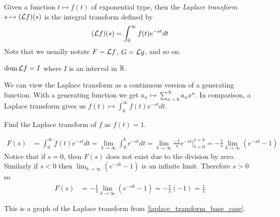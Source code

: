 \documentclass[notes]{subfiles}
\begin{document}
\begin{definition}
    Given a function $t \mapsto f(t)$ of exponential type, then the \textsl{Laplace transform} $s \mapsto (\mathcal{L} f)(s)$ is the integral transform defined by
    \[
        (\mathcal{L} f)(s) = \int_0^\infty f(t)e^{-st}dt
    \]
    Note that we usually notate $F = \mathcal{L} f$, $G = \mathcal{L} g$, and so on.
\end{definition}

\begin{theorem}
    $\operatorname{dom} \mathcal{L} f = I$ where $I$ is an interval in $\mathbb{R}$.
\end{theorem}

We can view the Laplace transform as a continuous version of a generating function. With a generating function we get $a_n \mapsto \sum_{n = 0}^\infty a_n x^n$. In comparison, a Laplace transform gives us $f(t) \mapsto \int_0^\infty f(t)e^{-st}dt$.

\begin{exercise} \label{laplace_transform_base_case}
    Find the Laplace transform of $f$ as $f(t) = 1$.
\end{exercise}
\begin{solution}
    \begin{align*}
        F(s)
        &= \int_0^\infty f(t)e^{-st}dt
        = \lim_{b\to\infty} \int_0^b e^{-st}dt
        = \lim_{b\to\infty} \frac{-1}{s}e^{-st}\Big|_{t = 0}^{t = b}
        = -\frac{1}{s} \lim_{b\to\infty} (e^{-sb} - 1)
    \end{align*}
    Notice that if $s = 0$, then $F(s)$ does not exist due to the division by zero. Similarly if $s < 0$ then $\lim_{b\to\infty} (e^{-sb} - 1)$ is an infinite limit. Therefore $s > 0$ so
    \begin{align*}
        F(s)
        &= -\frac{1}{s} \lim_{b\to\infty} (e^{-sb} - 1)
        = -\frac{1}{s}(-1)
        = \frac{1}{s}
    \end{align*}
\end{solution}

This is a graph of the Laplace transform from \cref{laplace_transform_base_case}.
\end{document}
